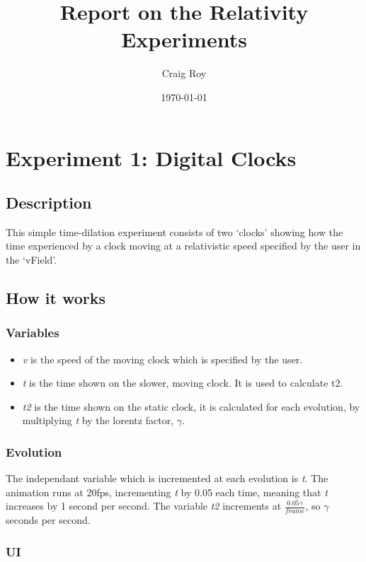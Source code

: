 \documentclass[11pt]{article}
\title{Report on the Relativity Experiments}
\author{Craig Roy}
\date{\today}
\begin{document}
\maketitle


\section*{Experiment 1: Digital Clocks}
\label{sec-1}
\subsection*{Description}
\label{sec-1-1}

This simple time-dilation experiment consists of two `clocks' showing how the time experienced by a clock moving at a relativistic speed specified by the user in the `vField'.
\subsection*{How it works}
\label{sec-1-2}
\subsubsection*{Variables}
\label{sec-1-2-1}

\begin{itemize}
\item \emph{v} is the speed of the moving clock which is specified by the user.
\item \emph{t} is the time shown on the slower, moving clock. It is used to calculate t2.
\item \emph{t2} is the time shown on the static clock, it is calculated for each evolution, by multiplying \emph{t} by the lorentz factor, $\gamma$.
\end{itemize}
\subsubsection*{Evolution}
\label{sec-1-2-2}

The independant variable which is incremented at each evolution is \emph{t}. The animation runs at 20fps, incrementing \emph{t} by 0.05 each time, meaning that \emph{t} increases by 1 second per second.
The variable \emph{t2} increments at $\frac{0.05 \gamma}{frame}$, so $\gamma$ seconds per second.
\subsubsection*{UI}
\label{sec-1-2-3}
\end{document}
